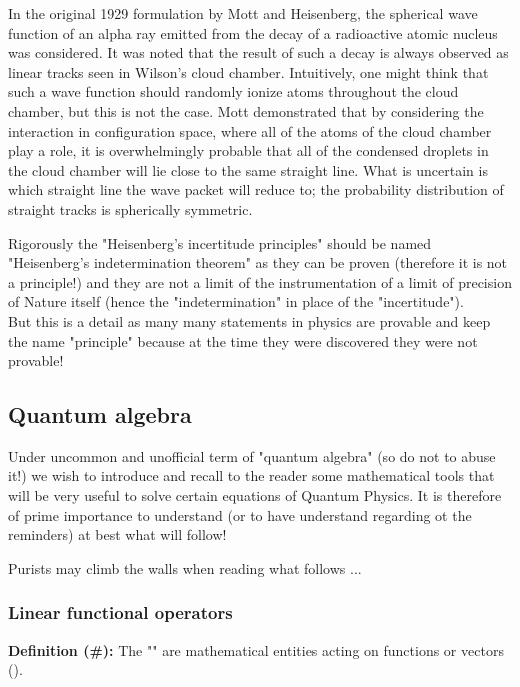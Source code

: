 	In the original 1929 formulation by Mott and Heisenberg, the spherical wave function of an alpha ray emitted from the decay of a radioactive atomic nucleus was considered. It was noted that the result of such a decay is always observed as linear tracks seen in Wilson's cloud chamber. Intuitively, one might think that such a wave function should randomly ionize atoms throughout the cloud chamber, but this is not the case. Mott demonstrated that by considering the interaction in configuration space, where all of the atoms of the cloud chamber play a role, it is overwhelmingly probable that all of the condensed droplets in the cloud chamber will lie close to the same straight line. What is uncertain is which straight line the wave packet will reduce to; the probability distribution of straight tracks is spherically symmetric. 
	\begin{tcolorbox}[title=Remark,colframe=black,arc=10pt]
	Rigorously the "Heisenberg's incertitude principles" should be named "Heisenberg's indetermination theorem" as they can be proven (therefore it is not a principle!) and they are not a limit of the instrumentation of a limit of precision of Nature itself (hence the "indetermination" in place of the "incertitude").\\
	
	But this is a detail as many many statements in physics are provable  and keep the name "principle" because at the time they were discovered they were not provable!
	\end{tcolorbox}

	\pagebreak
	\subsection{Quantum algebra}
	Under uncommon and unofficial term of "quantum algebra" (so do not to abuse it!) we wish to introduce and recall to the reader some mathematical tools  that will be very useful to solve certain equations of Quantum Physics. It is therefore of prime importance to understand (or to have understand  regarding ot the reminders) at best what will follow!
	
	\begin{tcolorbox}[title=Remark,colframe=black,arc=10pt]
	Purists may climb the walls when reading what follows ...
	\end{tcolorbox}
	
	\subsubsection{Linear functional operators}
	\textbf{Definition (\#\mydef):} The "" are mathematical entities acting on functions or vectors ().

